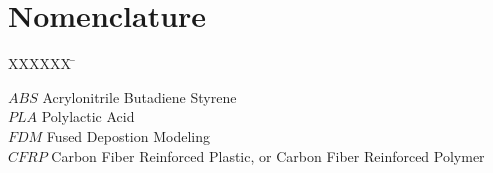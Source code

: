 \section{Nomenclature}

\begin{tabbing}

  XXXXXX \= \kill%

  $ABS$ \> Acrylonitrile Butadiene Styrene\\
  $PLA$ \> Polylactic Acid\\
  $FDM$ \> Fused Depostion Modeling\\
  $CFRP$ \> Carbon Fiber Reinforced Plastic, or Carbon Fiber Reinforced Polymer\\
  
\end{tabbing}